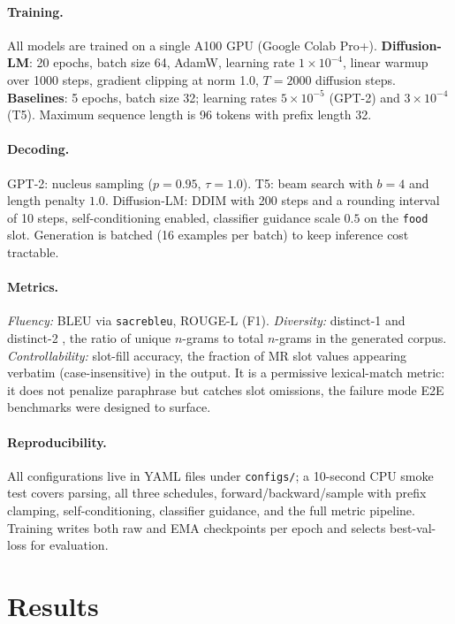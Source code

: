 \documentclass{llncs}
\begin{document}
\paragraph{Training.} All models are trained on a single A100 GPU
(Google Colab Pro+). \textbf{Diffusion-LM}: 20 epochs, batch size 64, AdamW,
learning rate $1\!\times\!10^{-4}$, linear warmup over 1000 steps, gradient
clipping at norm 1.0, $T\!=\!2000$ diffusion steps. \textbf{Baselines}: 5
epochs, batch size 32; learning rates $5\!\times\!10^{-5}$ (GPT-2) and
$3\!\times\!10^{-4}$ (T5). Maximum sequence length is 96 tokens with prefix
length 32.

\paragraph{Decoding.} GPT-2: nucleus sampling ($p\!=\!0.95$, $\tau\!=\!1.0$).
T5: beam search with $b\!=\!4$ and length penalty $1.0$. Diffusion-LM: DDIM
\cite{song2021ddim} with 200 steps and a rounding interval of 10 steps,
self-conditioning enabled, classifier guidance scale $0.5$ on the
\texttt{food} slot. Generation is batched (16 examples per batch) to keep
inference cost tractable.

\paragraph{Metrics.} \emph{Fluency:} BLEU \cite{papineni2002bleu} via
\texttt{sacrebleu}, ROUGE-L \cite{lin2004rouge} (F1). \emph{Diversity:}
distinct-1 and distinct-2 \cite{li2016diversity}, the ratio of unique
$n$-grams to total $n$-grams in the generated corpus. \emph{Controllability:}
slot-fill accuracy, the fraction of MR slot values appearing verbatim
(case-insensitive) in the output. It is a permissive lexical-match metric:
it does not penalize paraphrase but catches slot omissions, the failure mode
E2E benchmarks were designed to surface.

\paragraph{Reproducibility.} All configurations live in YAML files under
\texttt{configs/}; a 10-second CPU smoke test covers parsing, all three
schedules, forward/backward/sample with prefix clamping, self-conditioning,
classifier guidance, and the full metric pipeline. Training writes both
raw and EMA checkpoints per epoch and selects best-val-loss for evaluation.

\section{Results}
\label{sec:results}
\end{document}
